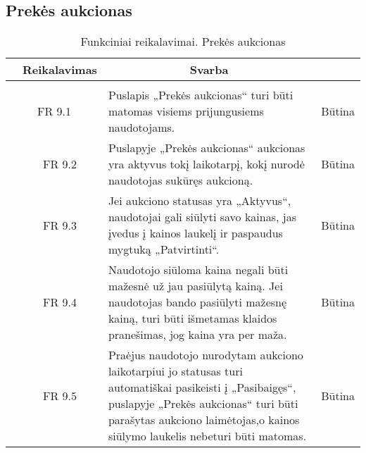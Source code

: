 \documentclass{VUMIFPSkursinis}
\begin{document}
\subsection{Prekės aukcionas}
\begin{table}[H]
	\caption{Funkciniai reikalavimai. Prekės aukcionas}
	\begin{tabular}{|p{1cm}|p{1cm}|p{}|p{}|}
		\hline 
		\rowcolor{gray!50}
		\multicolumn{2}{|c|}{{\bfseries Kodas}}&
		\multicolumn{1}{c|}{{\bfseries Reikalavimas}}&
		\multicolumn{1}{c|}{{\bfseries Svarba}}\\
		\hline
		\rowcolor{lightgray}
		\multicolumn{4}{|c|}{Prekės aukcionas}\\				
		\hline
		\multicolumn{2}{|c|}{FR 9.1}&
		{Puslapis „Prekės aukcionas“ turi būti matomas visiems prijungusiems naudotojams.
		}&		
		\multicolumn{1}{c|}{Būtina}\\
		\hline
		\multicolumn{1}{|c}{}&
		\multicolumn{1}{c|}{FR 9.2}&
		{Puslapyje „Prekės aukcionas“ aukcionas yra aktyvus tokį laikotarpį, kokį nurodė naudotojas sukūręs aukcioną.
		}&		
		\multicolumn{1}{c|}{Būtina}\\
		\hline	
		\multicolumn{1}{|c}{}&
		\multicolumn{1}{c|}{FR 9.3}&
		{Jei aukciono statusas yra „Aktyvus“, naudotojai gali siūlyti savo kainas, jas įvedus į kainos laukelį ir paspaudus mygtuką „Patvirtinti“.
		}&
		\multicolumn{1}{c|}{Būtina}\\									
		\hline
		\multicolumn{1}{|c}{}&
		\multicolumn{1}{c|}{FR 9.4}&
		{Naudotojo siūloma kaina negali būti mažesnė už jau pasiūlytą kainą. Jei naudotojas bando pasiūlyti mažesnę kainą, turi būti išmetamas klaidos pranešimas, jog kaina yra per maža.
		}&
		\multicolumn{1}{c|}{Būtina}\\									
		\hline
		\multicolumn{1}{|c}{}&
		\multicolumn{1}{c|}{FR 9.5}&
		{Praėjus naudotojo nurodytam aukciono laikotarpiui jo statusas turi automatiškai pasikeisti į „Pasibaigęs“, puslapyje „Prekės aukcionas“ turi būti parašytas aukciono laimėtojas,o kainos siūlymo laukelis nebeturi būti matomas.
		}&
		\multicolumn{1}{c|}{Būtina}\\									
		\hline
	\end{tabular}		
\end{table}
\end{document}
